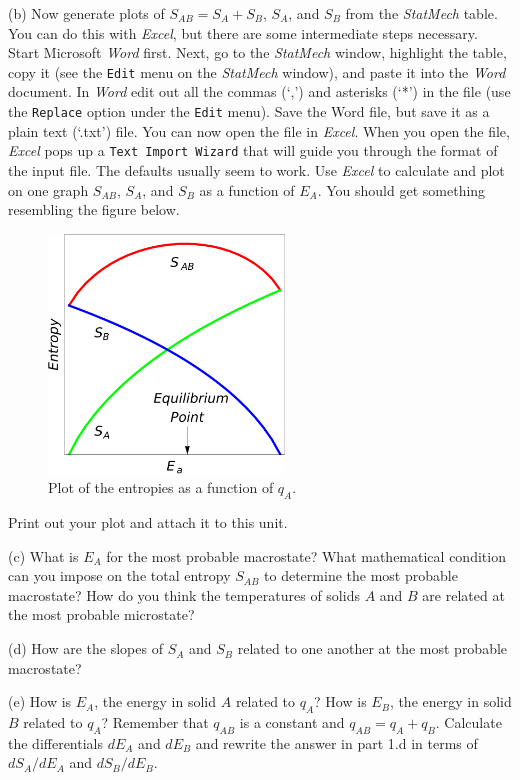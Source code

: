 (b) Now generate plots of $S_{AB}=S_A + S_B$, $S_A$, and $S_B$ from the {\it StatMech} table.
You can do this with {\it Excel}, but there are some intermediate steps necessary.
Start Microsoft {\it Word} first.
Next, go to the {\it StatMech} window, highlight the table, copy it
 (see the {\tt Edit} menu on the {\it StatMech} window), and paste it into the {\it Word}
document. 
In {\it Word} edit out all the commas (`,') and asterisks (`*') in the file 
(use the {\tt Replace}
option under the {\tt Edit} menu).
Save the Word file, but save it as a plain text (`\*.txt') file.
You can now open the file in {\it Excel}.
When you open the file, {\it Excel} pops up a {\tt Text Import Wizard} 
that will guide you through
the format of the input file.
The defaults usually seem to work.
Use {\it Excel} to calculate and plot on one graph $S_{AB}$, $S_A$, and $S_B$
as a function of $E_A$.
You should get something resembling the figure below.
\begin{figure}[hb!]
\begin{center}
\includegraphics[height=2.5in]{entropy_temperature/NumberOfStates5.pdf}
\caption{Plot of the entropies as a function of $q_A$.}
\end{center}
\end{figure}
Print out your plot and attach it to this unit.

(c) What is $E_A$ for the most probable macrostate? What mathematical condition can you impose
on the total entropy $S_{AB}$ to determine the most probable macrostate?
How do you think the temperatures of solids $A$ and $B$ are related at the most probable 
microstate?
\vspace{15mm}

(d) How are the slopes of $S_A$ and $S_B$ related to one another at the most probable
macrostate?
\vspace{40mm}

(e) How is $E_A$, the energy in solid $A$ related to $q_A$?
How is $E_B$, the energy in solid $B$ related to $q_A$?
Remember that $q_{AB}$ is a constant and $q_{AB} = q_A + q_B$.
Calculate the differentials $dE_A$ and $dE_B$ and rewrite the answer in part 1.d
in terms of $dS_A/dE_A$ and $dS_B/dE_B$.
\vspace{55mm}

